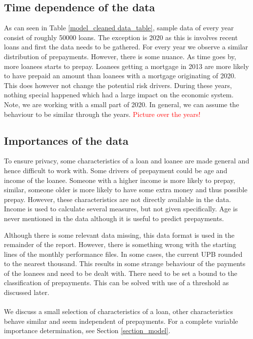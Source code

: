 \subsection{Time dependence of the data}
    As can seen in Table \ref{model_cleaned data_table}, sample data of every year consist of roughly 50000 loans. The exception is 2020 as this is involves recent loans and first the data needs to be gathered. For every year we observe a similar distribution of prepayments. However, there is some nuance. As time goes by, more loanees starts to prepay. Loanees getting a mortgage in 2013 are more likely to have prepaid an amount than loanees with a mortgage originating of 2020. This does however not change the potential risk drivers. During these years, nothing special happened which had a large impact on the economic system. Note, we are working with a small part of 2020. In general, we can assume the behaviour to be similar through the years.
    \textcolor{red}{Picture over the years!}

\subsection{Importances of the data}
    To ensure privacy, some characteristics of a loan and loanee are made general and hence difficult to work with. Some drivers of prepayment could be age and income of the loanee. Someone with a higher income is more likely to prepay, similar, someone older is more likely to have some extra money and thus possible prepay. However, these characteristics are not directly available in the data. Income is used to calculate several measures, but not given specifically. Age is never mentioned in the data although it is useful to predict prepayments.  

    Although there is some relevant data missing, this data format is used in the remainder of the report.  However, there is something wrong with the starting lines of the monthly performance files. In some cases, the current UPB rounded to the nearest thousand. This results in some strange behaviour of the payments of the loanees and need to be dealt with. There need to be set a bound to the classification of prepayments. This can be solved with use of a threshold as discussed later. 
    \\\\
    We discuss a small selection of characteristics of a loan, other characteristics behave similar and seem independent of prepayments. For a complete variable importance determination, see Section \ref{section_model}. 
    
